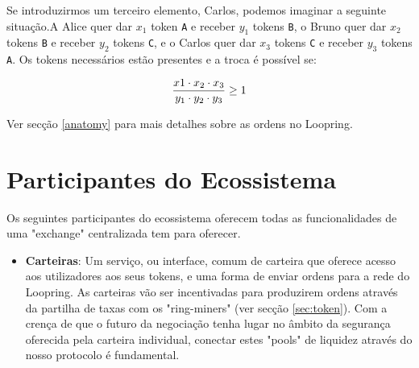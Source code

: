 \documentclass[UTF8,nofonts]{article}
\begin{document}
\begin{multicols}{2}
Se introduzirmos um terceiro elemento, Carlos, podemos imaginar a seguinte situação.A Alice quer dar $x_1$ token \verb|A| e receber $y_1$ tokens \verb|B|, o Bruno quer dar $x_2$ tokens \verb|B| e receber $y_2$ tokens \verb|C|, e o Carlos quer dar $x_3$ tokens \verb|C| e receber $y_3$ tokens \verb|A|. Os tokens necessários estão presentes e a troca é possível se:

\begin{equation}
{{x1 \cdot x_2 \cdot x_3 \over y_1 \cdot y_2 \cdot y_3} \geq 1}
\end{equation}


Ver secção \ref{anatomy} para mais detalhes sobre as ordens no Loopring.



\section{Participantes do Ecossistema\label{sec:ecosystem}}
Os seguintes participantes do ecossistema oferecem todas as funcionalidades de uma "exchange" centralizada tem para oferecer.

\begin{itemize}
\item \textbf{Carteiras}: Um serviço, ou interface, comum de carteira que oferece acesso aos utilizadores aos seus tokens, e uma forma de enviar ordens para a rede do Loopring. As carteiras vão ser incentivadas para produzirem ordens através da partilha de taxas com os "ring-miners" (ver secção \ref{sec:token}). Com a crença de que o futuro da negociação tenha lugar no âmbito da segurança oferecida pela carteira individual, conectar estes "pools" de liquidez através do nosso protocolo é fundamental.


\end{itemize}
\end{multicols}
\end{document}
